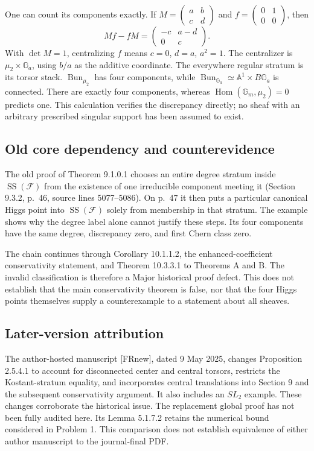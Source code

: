 \documentclass[10pt]{article}
\begin{document}
One can count its components exactly. If \(M=\left(\begin{smallmatrix}a&b\\c&d\end{smallmatrix}\right)\) and \(f=\left(\begin{smallmatrix}0&1\\0&0\end{smallmatrix}\right)\), then \[Mf-fM=\begin{pmatrix}-c&a-d\\0&c\end{pmatrix}.\] With \(\det M=1\), centralizing \(f\) means \(c=0\), \(d=a\), \(a^2=1\). The centralizer is \(\mu_2\times\mathbb G_a\), using \(b/a\) as the additive coordinate. The everywhere regular stratum is its torsor stack. \(\operatorname{Bun}_{\mu_2}\) has four components, while \(\operatorname{Bun}_{\mathbb G_a}\simeq\mathbb A^1\times B\mathbb G_a\) is connected. There are exactly four components, whereas \(\operatorname{Hom}(\mathbb G_m,\mu_2)=0\) predicts one. This calculation verifies the discrepancy directly; no sheaf with an arbitrary prescribed singular support has been assumed to exist.\par
\subsection*{Old core dependency and counterevidence}
The old proof of Theorem 9.1.0.1 chooses an entire degree stratum inside \(\operatorname{SS}(\mathcal F)\) from the existence of one irreducible component meeting it (Section 9.3.2, p. 46, source lines 5077–5086). On p. 47 it then puts a particular canonical Higgs point into \(\operatorname{SS}(\mathcal F)\) solely from membership in that stratum. The example shows why the degree label alone cannot justify these steps. Its four components have the same degree, discrepancy zero, and first Chern class zero.\par
The chain continues through Corollary 10.1.1.2, the enhanced-coefficient conservativity statement, and Theorem 10.3.3.1 to Theorems A and B. The invalid classification is therefore a Major historical proof defect. This does not establish that the main conservativity theorem is false, nor that the four Higgs points themselves supply a counterexample to a statement about all sheaves.\par
\subsection*{Later-version attribution}
The author-hosted manuscript [FRnew], dated 9 May 2025, changes Proposition 2.5.4.1 to account for disconnected center and central torsors, restricts the Kostant-stratum equality, and incorporates central translations into Section 9 and the subsequent conservativity argument. It also includes an \(SL_2\) example. These changes corroborate the historical issue. The replacement global proof has not been fully audited here. Its Lemma 5.1.7.2 retains the numerical bound considered in Problem 1. This comparison does not establish equivalence of either author manuscript to the journal-final PDF.\par
\end{document}
